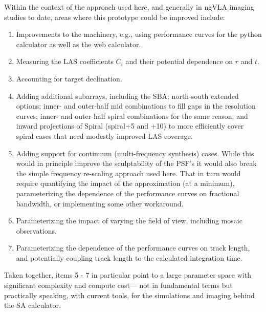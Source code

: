 \documentclass[11pt]{article}
\begin{document}
Within the context of the approach used here, and generally in ngVLA
imaging studies to date, areas where this prototype could be
improved include:
\begin{enumerate}
\item Improvements to the machinery, e.g., using performance curves
  for the python calculator as well as the web calculator.
\item Measuring the LAS coefficients $C_i$ and their potential
  dependence on $r$ and $t$.
\item Accounting for target declination.
\item Adding additional subarrays, including the SBA; north-south extended options;
  inner- and outer-half mid combinations to fill gaps in the resolution
  curves; inner- and outer-half spiral combinations for the same reason;
  and inward projections of Spiral (spiral+5 and +10) to more efficiently
  cover spiral cases that need modestly improved LAS coverage. 
\item Adding support for continuum (multi-frequency synthesis) cases.
  While this would in principle improve the sculptability of the PSF's
  it would also break the simple frequency re-scaling approach used
  here.  That in turn would require quantifying the impact of the
  approximation (at a minimum),  parameterizing the
  dependence of the performance curves on fractional bandwidth, or implementing some
  other workaround.
\item Parameterizing the impact of varying the field of view, including mosaic
  observations.    
\item Parameterizing the dependence of the performance curves on track length,
  and potentially coupling track length to the calculated integration time.
\end{enumerate}
Taken together, items 5 - 7 in particular point to a large parameter
space with significant complexity and compute cost--- not in
fundamental terms but practically speaking, with current tools, for
the simulations and imaging behind the SA calculator.
\end{document}
